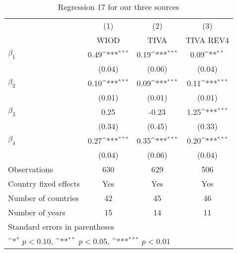 \begin{table}[htbp]\centering
\def\sym#1{\ifmmode^{#1}\else\(^{#1}\)\fi}
\caption{Regression 17 for our three sources}
\begin{tabular}{l*{3}{c}}
\toprule
                    &\multicolumn{1}{c}{(1)}&\multicolumn{1}{c}{(2)}&\multicolumn{1}{c}{(3)}\\
                    &\multicolumn{1}{c}{WIOD}&\multicolumn{1}{c}{TIVA}&\multicolumn{1}{c}{TIVA REV4}\\
\midrule
$ \beta_{1} $       &        0.49\sym{***}&        0.19\sym{***}&        0.09\sym{**} \\
                    &      (0.04)         &      (0.06)         &      (0.04)         \\
\addlinespace
$ \beta_{2} $       &        0.10\sym{***}&        0.09\sym{***}&        0.11\sym{***}\\
                    &      (0.01)         &      (0.01)         &      (0.01)         \\
\addlinespace
$ \beta_{3} $       &        0.25         &       -0.23         &        1.25\sym{***}\\
                    &      (0.34)         &      (0.45)         &      (0.33)         \\
\addlinespace
$ \beta_{4} $       &        0.27\sym{***}&        0.35\sym{***}&        0.20\sym{***}\\
                    &      (0.04)         &      (0.06)         &      (0.04)         \\
\midrule
Observations        &         630         &         629         &         506         \\
Country fixed effects&         Yes         &         Yes         &         Yes         \\
Number of countries &          42         &          45         &          46         \\
Number of years     &          15         &          14         &          11         \\
\bottomrule
\multicolumn{4}{l}{\footnotesize Standard errors in parentheses}\\
\multicolumn{4}{l}{\footnotesize \sym{*} \(p<0.10\), \sym{**} \(p<0.05\), \sym{***} \(p<0.01\)}\\
\end{tabular}
\end{table}
